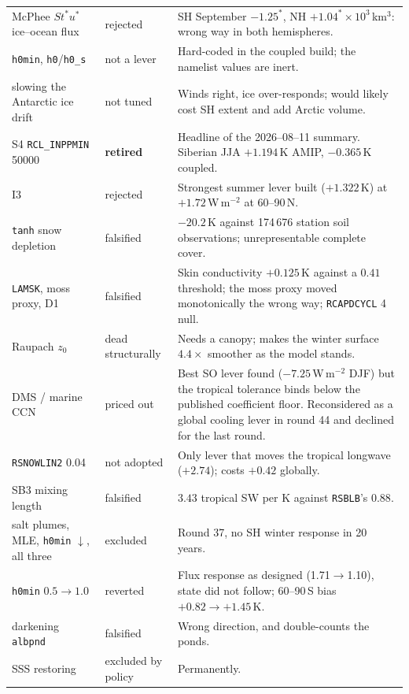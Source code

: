 \documentclass[10pt]{article}
\begin{document}
{\begin{longtable}{p{3.4cm}p{1.5cm}p{10.9cm}}
McPhee $St^*u^*$ ice--ocean flux & rejected & SH September $-1.25^*$, NH $+1.04^*\times10^3$\,km$^3$:
wrong way in both hemispheres. \\
\texttt{h0min}, \texttt{h0}/\texttt{h0\_s} & not a lever & Hard-coded in the coupled build; the
namelist values are inert. \\
slowing the Antarctic ice drift & not tuned & Winds right, ice over-responds; would likely cost SH
extent and add Arctic volume. \\
\midrule
S4 \texttt{RCL\_INPPMIN} 50000 & \textbf{retired} & Headline of the 2026--08--11 summary.
Siberian JJA $+1.194$\,K AMIP, $-0.365$\,K coupled. \\
I3 & rejected & Strongest summer lever built ($+1.322$\,K) at $+1.72$\,W\,m$^{-2}$ at
60--90\,N. \\
\texttt{tanh} snow depletion & falsified & $-20.2$\,K against 174\,676 station soil
observations; unrepresentable complete cover. \\
\texttt{LAMSK}, moss proxy, D1 & falsified & Skin conductivity $+0.125$\,K against a
$0.41$ threshold; the moss proxy moved monotonically the wrong way; \texttt{RCAPDCYCL} 4
null. \\
Raupach $z_0$ & dead structurally & Needs a canopy; makes the winter surface $4.4\times$
smoother as the model stands. \\
DMS / marine CCN & priced out & Best SO lever found ($-7.25$\,W\,m$^{-2}$ DJF) but the
tropical tolerance binds below the published coefficient floor. Reconsidered as a global cooling
lever in round 44 and declined for the last round. \\
\texttt{RSNOWLIN2} 0.04 & not adopted & Only lever that moves the tropical longwave
($+2.74$); costs $+0.42$ globally. \\
SB3 mixing length & falsified & $3.43$ tropical SW per K against \texttt{RSBLB}'s $0.88$. \\
salt plumes, MLE, \texttt{h0min} $\downarrow$, all three & excluded & Round 37, no SH winter
response in 20 years. \\
\texttt{h0min} $0.5\to1.0$ & reverted & Flux response as designed (1.71$\to$1.10), state did
not follow; 60--90\,S bias $+0.82\to+1.45$\,K. \\
darkening \texttt{albpnd} & falsified & Wrong direction, and double-counts the ponds. \\
SSS restoring & excluded by policy & Permanently. \\
\bottomrule
\end{longtable}}
\end{document}

